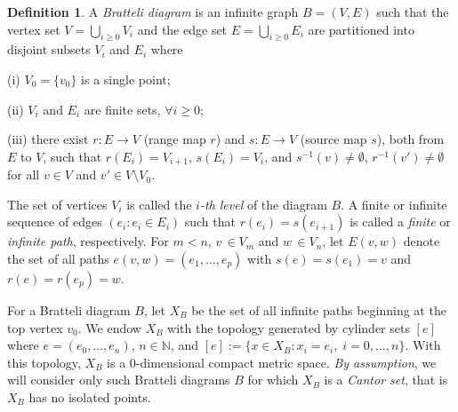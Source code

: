 \documentclass[11pt, english, reqno]{amsart}
\theoremstyle{definition}
\newtheorem{defin}{Definition}[section]
\theoremstyle{remark}
\theoremstyle{plain}
\numberwithin{equation}{section}
\begin{document}
\begin{defin}
 A {\it Bratteli diagram} is an infinite graph $B=(V,E)$ such that the
  vertex set  $V =\bigcup_{i\geq 0}V_i$ and the edge set
  $E = \bigcup_{i\geq 0}E_i$ are   partitioned into disjoint subsets
  $V_i$ and $E_i$ where

(i) $V_0=\{v_0\}$ is a single point;

(ii) $V_i$ and $E_i$ are finite sets, $\forall i \geq 0$;

(iii) there exist $r : E \to V$ (range map $r$) and
$s : E \to V$ (source map  $s$), both from $E$ to $V$, such that
 $r(E_i)= V_{i+1}$, $s(E_i)= V_{i}$,
  and $s^{-1}(v)\neq\emptyset$, $r^{-1}(v')\neq\emptyset$ for all
   $v\in V$  and $v'\in V\setminus V_0$.

\end{defin}

The set of vertices $V_i$ is called the \textit{$i$-th level} of the
diagram $B$. A finite or infinite sequence of edges $(e_i : e_i\in E_i)$
such that $r(e_{i})=s(e_{i+1})$ is called a {\it finite} or {\it infinite
path}, respectively. For $m<n$, $v\, \in V_{m}$ and $w\,\in V_{n}$,
let $E(v,w)$ denote the set of all paths $e(v, w) = (e_{1},\ldots,
e_{p})$ with $s(e) = s(e_{1})=v$ and $r(e) = r(e_{p})=w$.

For a Bratteli diagram $B$,
let $X_B$ be the set of all infinite paths beginning at the top vertex
 $v_0$.
 We endow $X_B$ with the topology generated by cylinder sets
$[e]$ where $e = (e_0, ... , e_n)$,  $n \in \mathbb N$, and
$[e]:=\{x\in X_B : x_i=e_i,\; i = 0, \ldots, n\}$. With this topology,
$X_B$ is a  0-dimensional compact metric space.
\textit{By assumption}, we will consider only such Bratteli diagrams $B$ for
which $X_B$ is a {\em Cantor set}, that is $X_B$ has no isolated
 points. 
\end{document}
